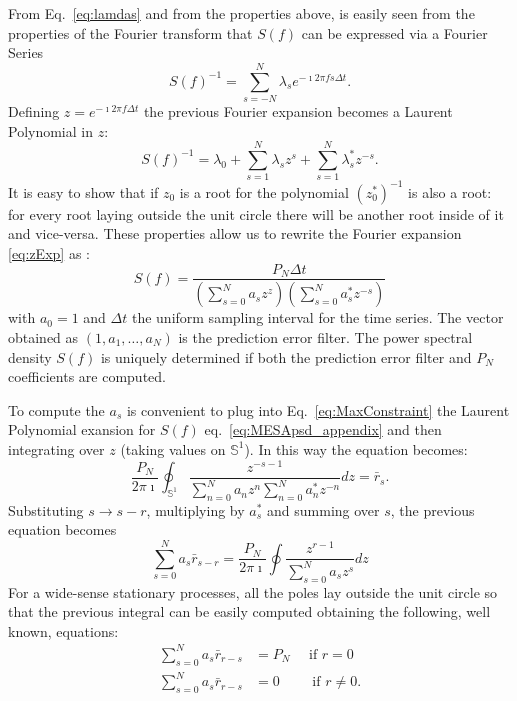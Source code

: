 \documentclass{aa}
\begin{document}
\begin{appendix}
From Eq.~\eqref{eq:lamdas} and from the properties above, is easily seen from the properties of the Fourier transform that $S(f)$ can be expressed via a Fourier Series 
\begin{equation}\label{eq:PSDconstraint}
    S(f)^{-1} = \sum_{s = -N}^N \lambda_s e^{-\imath 2 \pi f s \Delta t}.
\end{equation}
Defining $z = e^{-\imath 2 \pi f \Delta t}$ the previous Fourier expansion becomes a Laurent Polynomial in $z$: 
\begin{equation}
    \label{eq:zExp}
    S(f)^{-1} = \lambda_0 + \sum_{s = 1}^N \lambda_s z^s + \sum_{s = 1}^N \lambda^*_s z^{-s}.
\end{equation}
It is easy to show that if $z_0$ is a root for the polynomial $(z_0^*)^{-1}$ is also a root: for every root laying outside the unit circle there will be another root inside of it and vice-versa. These properties allow us to rewrite the Fourier expansion \eqref{eq:zExp} as \citep{1975STIN...7714318B}:
\begin{equation}\label{eq:MESApsd_appendix}
    S(f) = \frac{P_N \Delta t}{\left(\sum_{s=0}^N a_s z^z\right)\left(\sum_{s = 0}^N a^*_s z^{-s}\right)}
\end{equation}
with $a_0 = 1$ and $\Delta t$ the uniform sampling interval for the time series. The vector obtained as $(1, a_1, \dots, a_N)$ is the prediction error filter. The power spectral density $S(f)$ is uniquely determined if both the prediction error filter and $P_N$ coefficients are computed.

To compute the $a_s$ is convenient to plug into Eq.~\eqref{eq:MaxConstraint} the Laurent Polynomial exansion for $S(f)$ eq.~\eqref{eq:MESApsd_appendix} and then integrating over $z$ (taking values on ${\mathbb S^1}$). In this way the equation becomes:
\begin{equation}
    \label{eq:contourintegral}
   \frac{P_N}{2 \pi \imath} \oint _{\mathbb S^1}\frac{z^{-s - 1}}{\sum_{n = 0}^N a_n z^n \sum_{n = 0}^N a^*_n z^{-n}}dz = \bar r_s. 
\end{equation}
Substituting $s \to s - r$, multiplying by $a^*_s$ and summing over $s$, the previous equation becomes 
\begin{equation}
    \label{eq:errorFilter}
    \sum_{s = 0}^N a_s \bar r_{s - r} = \frac{P_N}{2 \pi \imath}\oint \frac{z^{r -1}}{\sum_{s = 0}^N a_s z^s}dz
\end{equation}
For a wide-sense stationary processes, all the poles lay outside the unit circle so that the previous integral can be easily computed obtaining the following, well known, equations: 
\begin{align}
    \label{eq:errorFilter1}
    \sum_{s = 0}^N a_s \bar r_{r - s} &= P_N \quad \text{ if } r = 0 \\ \label{eq:errorFilter2}
    \sum_{s = 0}^N a_s \bar r_{r - s} & = 0 \qquad \text{ if } r \neq 0.
\end{align}


\end{appendix}
\end{document}
